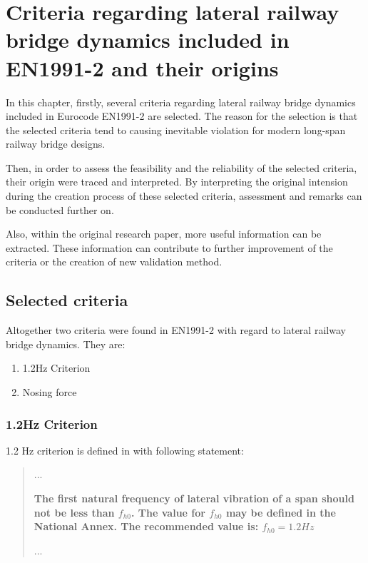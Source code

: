 
\chapter{Criteria regarding lateral railway bridge dynamics included in EN1991-2 and their origins}\label{Chap:selectedCriteria}

In this chapter, firstly, several criteria regarding lateral railway bridge dynamics included in Eurocode EN1991-2 are selected. The reason for the selection is that the selected criteria tend to causing inevitable violation for modern long-span railway bridge designs. 

Then, in order to assess the feasibility and the reliability of the selected criteria, their origin were traced and interpreted. By interpreting the original intension during the creation process of these selected criteria, assessment and remarks can be conducted further on.

Also, within the original research paper, more useful information can be extracted. These information can contribute to further improvement of the criteria or the creation of new validation method.

\section{Selected criteria}

Altogether two criteria were found in EN1991-2 with regard to lateral railway bridge dynamics. They are:

\begin{enumerate}
	\item 1.2Hz Criterion
	\item Nosing force
\end{enumerate}

\subsection{1.2Hz Criterion}
1.2 Hz criterion is defined in \citet[A24.4.2.4]{EC12} with following statement:

\begin{quote}
	...

	\textbf{The first natural frequency of lateral vibration of a span should not be less than $f_{h0}$. The value for $f_{h0}$ may be defined in the National Annex. The recommended value is: $f_{h0}=1.2 Hz$}

	...

\end{quote}

